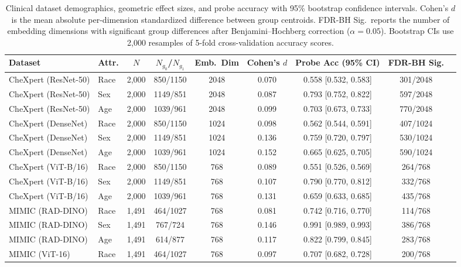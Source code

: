 \begin{table}[ht]
\centering
\scriptsize
\renewcommand{\arraystretch}{1.2}
\caption{Clinical dataset demographics, geometric effect sizes, and probe accuracy with 95\% bootstrap confidence intervals. Cohen's $d$ is the mean absolute per-dimension standardized difference between group centroids. FDR-BH Sig.\ reports the number of embedding dimensions with significant group differences after Benjamini--Hochberg correction ($\alpha{=}0.05$). Bootstrap CIs use 2{,}000 resamples of 5-fold cross-validation accuracy scores.}
\label{tab:demographics_effects}
\begin{tabular}{llccccccc}
\hline
\textbf{Dataset} & \textbf{Attr.} & \textbf{$N$} & \textbf{$N_{g_0}$/$N_{g_1}$} & \textbf{Emb.\ Dim} & \textbf{Cohen's $d$} & \textbf{Probe Acc (95\% CI)} & \textbf{FDR-BH Sig.} \\
\hline
CheXpert (ResNet-50) & Race & 2,000 & 850/1150 & 2048 & 0.070 & 0.558 [0.532, 0.583] & 301/2048 \\
CheXpert (ResNet-50) & Sex & 2,000 & 1149/851 & 2048 & 0.087 & 0.793 [0.752, 0.822] & 597/2048 \\
CheXpert (ResNet-50) & Age & 2,000 & 1039/961 & 2048 & 0.099 & 0.703 [0.673, 0.733] & 770/2048 \\
CheXpert (DenseNet) & Race & 2,000 & 850/1150 & 1024 & 0.098 & 0.562 [0.544, 0.591] & 407/1024 \\
CheXpert (DenseNet) & Sex & 2,000 & 1149/851 & 1024 & 0.136 & 0.759 [0.720, 0.797] & 530/1024 \\
CheXpert (DenseNet) & Age & 2,000 & 1039/961 & 1024 & 0.152 & 0.665 [0.625, 0.705] & 590/1024 \\
CheXpert (ViT-B/16) & Race & 2,000 & 850/1150 & 768 & 0.089 & 0.551 [0.526, 0.569] & 264/768 \\
CheXpert (ViT-B/16) & Sex & 2,000 & 1149/851 & 768 & 0.107 & 0.790 [0.770, 0.812] & 332/768 \\
CheXpert (ViT-B/16) & Age & 2,000 & 1039/961 & 768 & 0.131 & 0.659 [0.633, 0.685] & 435/768 \\
MIMIC (RAD-DINO) & Race & 1,491 & 464/1027 & 768 & 0.081 & 0.742 [0.716, 0.770] & 114/768 \\
MIMIC (RAD-DINO) & Sex & 1,491 & 767/724 & 768 & 0.146 & 0.991 [0.989, 0.993] & 386/768 \\
MIMIC (RAD-DINO) & Age & 1,491 & 614/877 & 768 & 0.117 & 0.822 [0.799, 0.845] & 283/768 \\
MIMIC (ViT-16) & Race & 1,491 & 464/1027 & 768 & 0.097 & 0.707 [0.682, 0.728] & 200/768 \\

\end{tabular}
\end{table}
